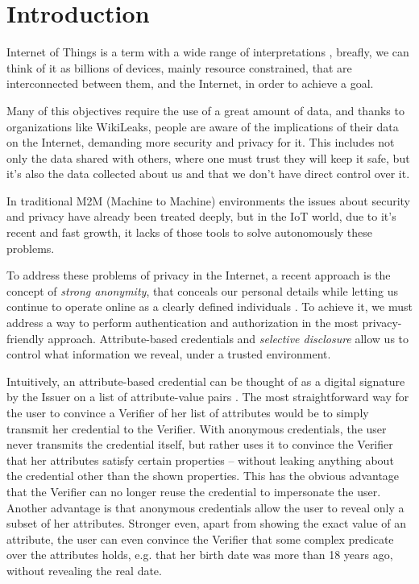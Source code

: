 \documentclass[journal]{IEEEtran}
\begin{document}
\section{Introduction}

Internet of Things is a term with a wide range of interpretations \cite{Atzori20102787}, breafly, we can think of it as billions of devices, mainly resource constrained, that are interconnected between them, and the Internet, in order to achieve a goal.

Many of this objectives require the use of a great amount of data, and thanks to organizations like WikiLeaks, people are aware of the implications of their data on the Internet, demanding more security and privacy for it. This includes not only the data shared with others, where one must trust they will keep it safe, but it's also the data collected about us and that we don't have direct control over it.

In traditional M2M (Machine to Machine) environments the issues about security and privacy have already been treated deeply, but in the IoT world, due to it's recent and fast growth, it lacks of those tools to solve autonomously these problems.

To address these problems of privacy in the Internet, a recent approach is the concept of \textit{strong anonymity}, that conceals our personal details while letting us continue to operate online as a clearly defined individuals \cite{stronganonymity}. To achieve it, we must address a way to perform authentication and authorization in the most privacy-friendly approach. Attribute-based credentials and \textit{selective disclosure} allow us to control what information we reveal, under a trusted environment.

Intuitively, an attribute-based credential can be thought of as a digital signature by the Issuer on a list of attribute-value pairs \cite{introCredIBM}.
The most straightforward way for the user to convince a Verifier of her list of attributes would be to simply transmit her credential to the Verifier.
With anonymous credentials, the user never transmits the credential itself, but rather uses it to convince the Verifier that her attributes satisfy certain properties – without leaking anything about the credential other than the shown properties. This has the obvious advantage that the Verifier can no longer reuse the credential to impersonate the user. Another advantage is that anonymous credentials allow the user to reveal only a subset of her attributes.
Stronger even, apart from showing the exact value of an attribute, the user can even convince the
Verifier that some complex predicate over the attributes holds, e.g. that her birth date was more than 18 years ago, without revealing the real date.
\end{document}
